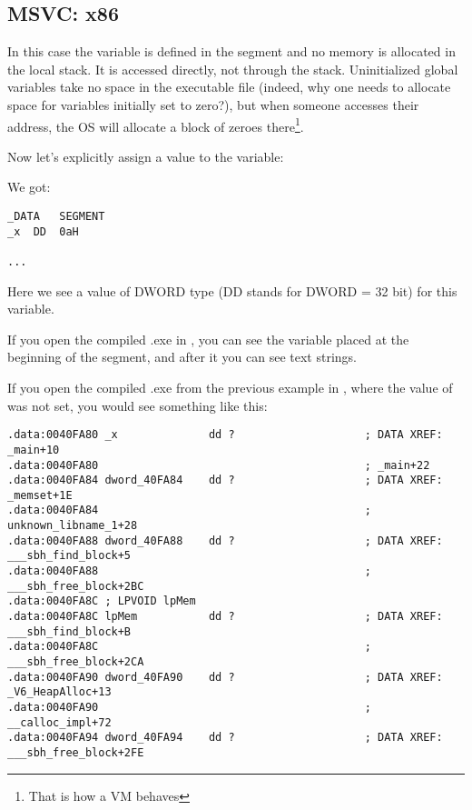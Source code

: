 \subsection{MSVC: x86}



In this case the  variable is defined in the  segment and no memory is allocated in the local stack. It is accessed directly, not through the stack. 
Uninitialized global variables take no space in the executable file
(indeed, why one needs to allocate space for variables initially set to zero?), 
but when someone accesses their address, 
the \ac{OS} will allocate a block of zeroes there\footnote{That is how a \ac{VM} behaves}.

Now let's explicitly assign a value to the variable:



We got:

\begin{lstlisting}
_DATA	SEGMENT
_x	DD	0aH

...
\end{lstlisting}

Here we see a value  of DWORD type (DD stands for DWORD = 32 bit) for this variable.

If you open the compiled .exe in \IDA, you can see the  variable placed at the beginning of 
the  segment, and after it you can see text strings.

If you open the compiled .exe from the previous example in \IDA, where the value of  was not set, you would see something like this:

\begin{lstlisting}
.data:0040FA80 _x              dd ?                    ; DATA XREF: _main+10
.data:0040FA80                                         ; _main+22
.data:0040FA84 dword_40FA84    dd ?                    ; DATA XREF: _memset+1E
.data:0040FA84                                         ; unknown_libname_1+28
.data:0040FA88 dword_40FA88    dd ?                    ; DATA XREF: ___sbh_find_block+5
.data:0040FA88                                         ; ___sbh_free_block+2BC
.data:0040FA8C ; LPVOID lpMem
.data:0040FA8C lpMem           dd ?                    ; DATA XREF: ___sbh_find_block+B
.data:0040FA8C                                         ; ___sbh_free_block+2CA
.data:0040FA90 dword_40FA90    dd ?                    ; DATA XREF: _V6_HeapAlloc+13
.data:0040FA90                                         ; __calloc_impl+72
.data:0040FA94 dword_40FA94    dd ?                    ; DATA XREF: ___sbh_free_block+2FE
\end{lstlisting}

